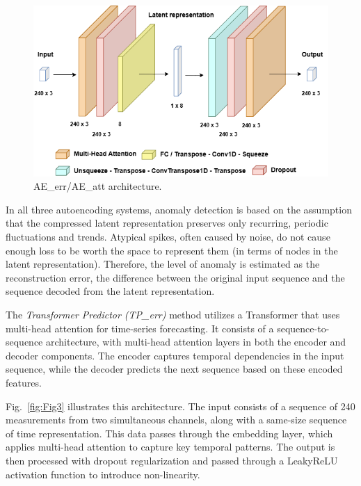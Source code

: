 \documentclass[conference]{IEEEtran}
\begin{document}
\begin{figure}[tb]
    \centering
    \includegraphics[width=1\columnwidth]{images/Fig2.png}  
    \caption{\label{fig:Fig2} AE\_err/AE\_att architecture.}
\end{figure}

In all three autoencoding systems, anomaly detection is based on the
assumption that the compressed latent representation preserves only
recurring, periodic fluctuations and trends. Atypical spikes, often
caused by noise, do not cause enough loss to be worth the space to
represent them (in terms of nodes in the latent representation).
Therefore, the level of anomaly is estimated as the reconstruction
error, the difference between the original input sequence and the
sequence decoded from the latent representation.

The \emph{Transformer Predictor (TP\_err)} method utilizes a
Transformer that uses multi-head attention for time-series
forecasting. It consists of a sequence-to-sequence architecture, with
multi-head attention layers in both the encoder and decoder
components. The encoder captures temporal dependencies in the input
sequence, while the decoder predicts the next sequence based on these
encoded features.

Fig.~\ref{fig:Fig3} illustrates this architecture. The input consists
of a sequence of 240 measurements from two simultaneous channels,
along with a same-size sequence of time representation. This data
passes through the embedding layer, which applies multi-head attention
to capture key temporal patterns. The output is then processed with
dropout regularization and passed through a LeakyReLU activation
function to introduce non-linearity.
\end{document}
